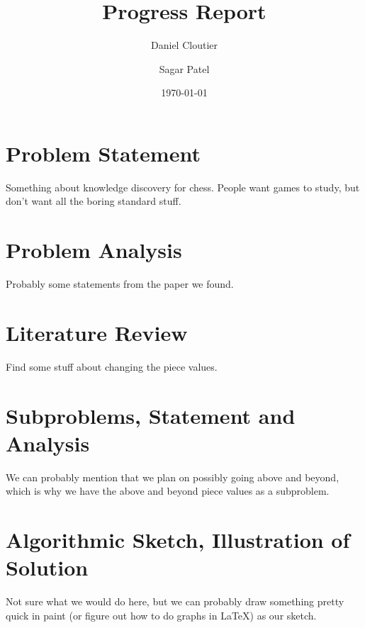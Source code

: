 \documentclass[12pt]{article}
\title{Progress Report}
\author{Daniel Cloutier \and Sagar Patel}
\date{\today}
\begin{document}
    \begin{singlespace}
        \maketitle 
    \end{singlespace}

    \section{Problem Statement}

    Something about knowledge discovery for chess. People want games to study, but don't want all the boring standard stuff.

    \section{Problem Analysis}

    Probably some statements from the paper we found.

    \section{Literature Review}

    Find some stuff about changing the piece values.

    \section{Subproblems, Statement and Analysis}

    We can probably mention that we plan on possibly going above and beyond, which is why we have the above and beyond piece 
    values as a subproblem.

    \section{Algorithmic Sketch, Illustration of Solution}

    Not sure what we would do here, but we can probably draw something pretty quick in paint (or figure out how to do graphs in 
    \LaTeX) as our sketch.
    
\end{document}
